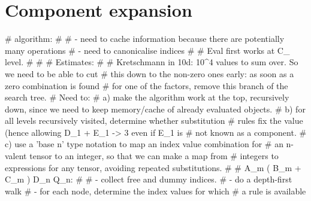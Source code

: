 
\section{Component expansion}



# algorithm:
#
# - need to cache information because there are potentially many operations
# - need to canonicalise indices 
#
# Eval first works at C_{\alpha} level. 
#
#
# Estimates:
#
#   Kretschmann in 10d: 10^4 values to sum over. So we need to be able to cut
#   this down to the non-zero ones early: as soon as a zero combination is found
#   for one of the factors, remove this branch of the search tree.
#   Need to:
#        a) make the algorithm work at the top, recursively down, since
            we need to keep memory/cache of already evaluated objects.
#        b) for all levels recursively visited, determine whether substitution
#           rules fix the value (hence allowing D_1 + E_1 -> 3 even if E_1 is 
#           not known as a component.
#        c) use a 'base n' type notation to map an index value combination for 
#           an n-valent tensor to an integer, so that we can make a map from
#           integers to expressions for any tensor, avoiding repeated substitutions.
#
#  A_m ( B_m + C_m ) D_n Q_n:
#
#   - collect free and dummy indices.
#   - do a depth-first walk
#          - for each node, determine the index values for which
#            a rule is available

